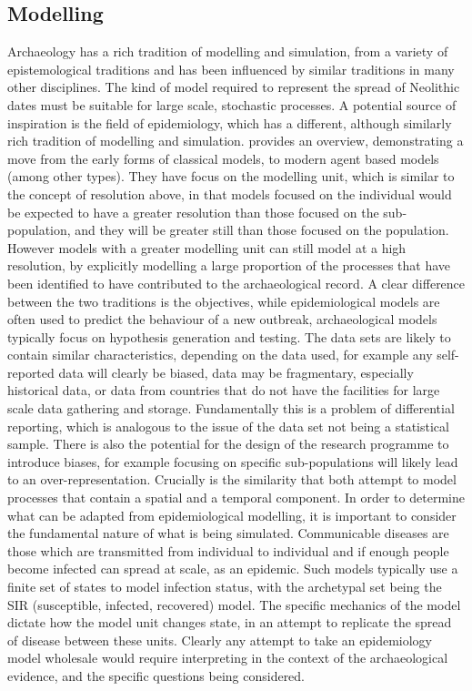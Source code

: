 \subsection{Modelling}
Archaeology has a rich tradition of modelling and simulation, from a variety of epistemological traditions and has been influenced by similar traditions in many other disciplines. The kind of model required to represent the spread of Neolithic dates must be suitable for large scale, stochastic processes. A potential source of inspiration is the field of epidemiology, which has a different, although similarly rich tradition of modelling and simulation. \citet{doi:10.1111/j.1467-9671.2012.01329.x} provides an overview, demonstrating a move from the early forms of classical models, to modern agent based models (among other types). They have focus on the modelling unit, which is similar to the concept of resolution above, in that models focused on the individual would be expected to have a greater resolution than those focused on the sub-population, and they will be greater still than those focused on the population. However models with a greater modelling unit can still model at a high resolution, by explicitly modelling a large proportion of the processes that have been identified to have contributed to the archaeological record. A clear difference between the two traditions is the objectives, while epidemiological models are often used to predict the behaviour of a new outbreak, archaeological models typically focus on hypothesis generation and testing. The data sets are likely to contain similar characteristics, depending on the data used, for example any self-reported data will clearly be biased, data may be fragmentary, especially historical data, or data from countries that do not have the facilities for large scale data gathering and storage. Fundamentally this is a problem of differential reporting, which is analogous to the issue of the data set not being a statistical sample. There is also the potential for the design of the research programme to introduce biases, for example focusing on specific sub-populations will likely lead to an over-representation. Crucially is the similarity that both attempt to model processes that contain a spatial and a temporal component. In order to determine what can be adapted from epidemiological modelling, it is important to consider the fundamental nature of what is being simulated. Communicable diseases are those which are transmitted from individual to individual and if enough people become infected can spread at scale, as an epidemic. Such models typically use a finite set of states to model infection status, with the archetypal set being the SIR (susceptible, infected, recovered) model. The specific mechanics of the model dictate how the model unit changes state, in an attempt to replicate the spread of disease between these units. Clearly any attempt to take an epidemiology model wholesale would require interpreting in the context of the archaeological evidence, and the specific questions being considered.

